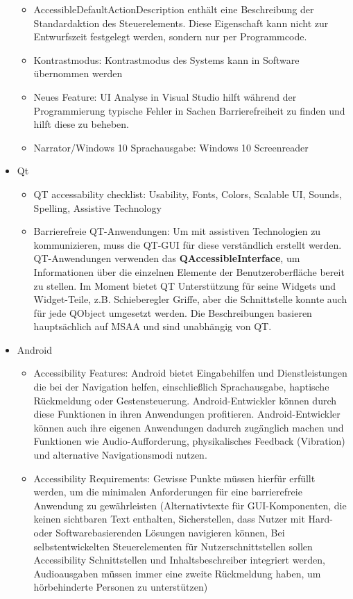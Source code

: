 \documentclass[paper=a4, fontsize=11pt]{scrartcl} %
\numberwithin{equation}{section} %
\numberwithin{figure}{section} %
\numberwithin{table}{section} %
\begin{document}
\begin{itemize}
\begin{itemize}
\item AccessibleDefaultActionDescription enthält eine Beschreibung der Standardaktion des Steuerelements. Diese Eigenschaft kann nicht zur Entwurfszeit festgelegt werden, sondern nur per Programmcode.
\item Kontrastmodus: Kontrastmodus des Systems kann in Software übernommen werden
\item Neues Feature: UI Analyse in Visual Studio hilft während der Programmierung typische Fehler in Sachen Barrierefreiheit zu finden und hilft diese zu beheben.
\item Narrator/Windows 10 Sprachausgabe: Windows 10 Screenreader
\end{itemize}
\item Qt
\begin{itemize}
\item QT accessability checklist: Usability, Fonts, Colors, Scalable UI, Sounds, Spelling, Assistive Technology
\item Barrierefreie QT-Anwendungen: Um mit assistiven Technologien zu kommunizieren, muss die QT-GUI für diese verständlich erstellt werden. QT-Anwendungen verwenden das \textbf{QAccessibleInterface}, um Informationen über die einzelnen Elemente der Benutzeroberfläche bereit zu stellen. Im Moment bietet QT Unterstützung für seine Widgets und Widget-Teile, z.B. Schieberegler Griffe, aber die Schnittstelle konnte auch für jede QObject umgesetzt werden. Die Beschreibungen basieren hauptsächlich auf MSAA und sind unabhängig von QT.
\end{itemize}
\item Android
\begin{itemize}
\item Accessibility Features: Android bietet Eingabehilfen und Dienstleistungen die bei der Navigation helfen, einschließlich Sprachausgabe, haptische Rückmeldung oder Gestensteuerung. Android-Entwickler können durch diese Funktionen in ihren Anwendungen profitieren. Android-Entwickler können auch ihre eigenen Anwendungen dadurch zugänglich machen und Funktionen wie Audio-Aufforderung, physikalisches Feedback (Vibration) und alternative Navigationsmodi nutzen.
\item Accessibility Requirements: Gewisse Punkte müssen hierfür erfüllt werden, um die minimalen Anforderungen für eine barrierefreie Anwendung zu gewährleisten (Alternativtexte für GUI-Komponenten, die keinen sichtbaren Text enthalten, Sicherstellen, dass Nutzer mit Hard- oder Softwarebasierenden Lösungen navigieren können, Bei selbstentwickelten Steuerelementen für Nutzerschnittstellen sollen Accessibility Schnittstellen und Inhaltsbeschreiber integriert werden, Audioausgaben müssen immer eine zweite Rückmeldung haben, um hörbehinderte Personen zu unterstützen)

\end{itemize}
\end{itemize}
\end{document}

